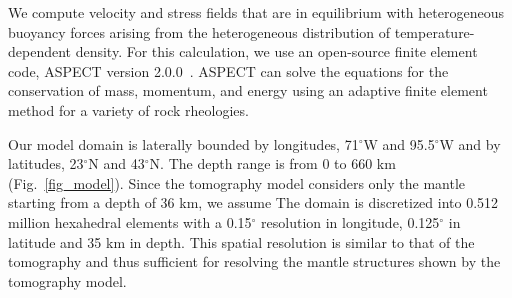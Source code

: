 \documentclass[draft,linenumbers]{agujournal2018}
\begin{document}
    We compute velocity and stress fields that are in equilibrium with heterogeneous buoyancy forces arising from the heterogeneous distribution of temperature-dependent density. For this calculation, we use an open-source finite element code, ASPECT version 2.0.0~\citep{heister_aspect_methods2,KHB12,aspect-doi-v2.0.0}. ASPECT can solve the equations for the conservation of mass, momentum, and energy using an adaptive finite element method for a variety of rock rheologies. 
    
     Our model domain is laterally bounded by longitudes, 71$^{\circ}$W and 95.5$^{\circ}$W and by latitudes, 23$^{\circ}$N and 43$^{\circ}$N. The depth range is from 0 to 660 km (Fig.~\ref{fig_model}). Since the tomography model considers only the mantle starting from a depth of 36 km, we assume   %
The domain is discretized into 0.512 million hexahedral elements with a 0.15$^{\circ}$ resolution in longitude, 0.125$^{\circ}$ in latitude and 35 km in depth. This spatial resolution is similar to that of the tomography and thus sufficient for resolving the mantle structures shown by the tomography model. 
\end{document}
